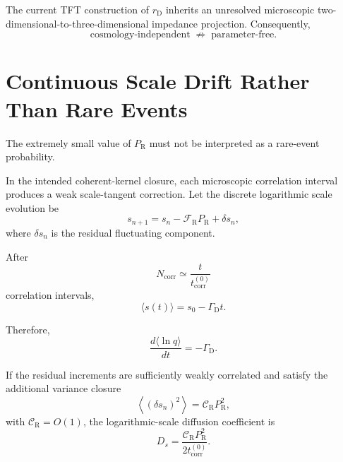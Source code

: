 The current TFT construction of $r_{\mathrm D}$ inherits an unresolved
microscopic two-dimensional-to-three-dimensional impedance projection.
Consequently,
\begin{equation}
    \boxed{
    \text{cosmology-independent}
    \;\not\Rightarrow\;
    \text{parameter-free}.
    }
\end{equation}


\section{Continuous Scale Drift Rather Than Rare Events}

The extremely small value of $P_{\mathrm R}$ must not be interpreted as a
rare-event probability.

In the intended coherent-kernel closure, each microscopic correlation interval
produces a weak scale-tangent correction. Let the discrete logarithmic scale
evolution be
\begin{equation}
    s_{n+1}
    =
    s_n
    -
    \mathcal F_{\mathrm R}
    P_{\mathrm R}
    +
    \delta s_n,
    \label{eq:AQ_discrete_drift}
\end{equation}
where $\delta s_n$ is the residual fluctuating component.

After
\begin{equation}
    N_{\mathrm{corr}}
    \simeq
    \frac{
        t
    }{
        t_{\mathrm{corr}}^{(0)}
    }
\end{equation}
correlation intervals,
\begin{equation}
    \langle s(t)\rangle
    =
    s_0
    -
    \Gamma_{\mathrm D}t.
    \label{eq:AQ_s_drift}
\end{equation}

Therefore,
\begin{equation}
    \boxed{
    \frac{
        d\langle\ln q\rangle
    }{
        dt
    }
    =
    -\Gamma_{\mathrm D}.
    }
\end{equation}

If the residual increments are sufficiently weakly correlated and satisfy the
additional variance closure
\begin{equation}
    \left\langle
        (\delta s_n)^2
    \right\rangle
    =
    \mathcal C_{\mathrm R}
    P_{\mathrm R}^{2},
    \label{eq:AQ_noise_assumption}
\end{equation}
with $\mathcal C_{\mathrm R}=O(1)$, the logarithmic-scale diffusion coefficient
is
\begin{equation}
    D_s
    =
    \frac{
        \mathcal C_{\mathrm R}
        P_{\mathrm R}^{2}
    }{
        2t_{\mathrm{corr}}^{(0)}
    }.
\end{equation}

